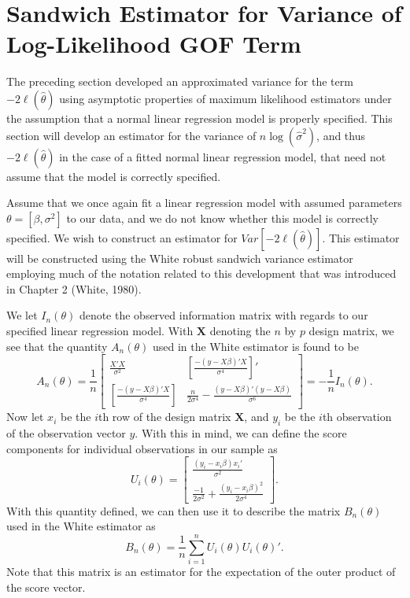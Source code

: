 		\section{Sandwich Estimator for Variance of Log-Likelihood GOF Term} \label{sec:sand_var}

		The preceding section developed an approximated variance for the term $-2 \ell (\hat{\theta})$ using asymptotic properties of maximum likelihood estimators under the assumption
		that a normal linear regression model is properly specified. This section will develop an estimator for the variance of $n\log(\hat{\sigma}^2)$, and thus $-2 \ell (\hat{\theta})$ in
		the case of a fitted normal linear regression model, that need not assume that the model is correctly specified.

		Assume that we once again fit a linear regression model with assumed parameters $\theta = [\beta, \sigma^2]$ to our data, and we do not know whether this model is correctly specified.
		We wish to construct an estimator for $Var \left[ -2 \ell (\hat{\theta}  ) \right]$. This estimator will be constructed using the White robust sandwich variance estimator employing
		much of the notation related to this development that was introduced in Chapter 2 (White, 1980).

		We let $I_{n} (\theta)$ denote the observed information matrix with regards to our specified linear regression model. With $\mathbf{X}$ denoting the $n$ by $p$ design matrix, we see that
		the quantity $A_n (\theta)$ used in the White estimator is found to be 
		\begin{equation}
			A_n(\theta) = \frac{1}{n}
			\begin{bmatrix}
				\frac{X'X}{\sigma^2} & \left[ \frac{-(y-X\beta)'X}{\sigma^4} \right]' \\
				\left[ \frac{-(y-X\beta)'X}{\sigma^4} \right] &  \frac{n}{2 \sigma^4} - \frac{(y-X\beta)'(y-X\beta)}{\sigma^6}
				\end{bmatrix}
				= -\frac{1}{n} I_n(\theta) .
		\end{equation}
		Now let $x_i$ be the $i$th row of the design matrix $\mathbf{X}$, and $y_i$ be the $i$th observation of the observation vector $y$. With this in mind, we can define the score components
		for individual observations in our sample as
		\begin{equation}
			U_i(\theta) = 
			\begin{bmatrix}
				\frac{(y_i-x_i \beta)x_i'}{\sigma^2} \\
				\frac{-1}{2 \sigma^2} + \frac{(y_i - x_i \beta)^2}{2 \sigma^4}
			\end{bmatrix}
			.
		\end{equation}
		With this quantity defined, we can then use it to describe the matrix $B_n (\theta)$ used in the White estimator as
		\begin{equation}
			B_n(\theta) = \frac{1}{n} \sum_{i=1}^{n} U_i(\theta) U_i(\theta)' .
		\end{equation}
		Note that this matrix is an estimator for the expectation of the outer product of the score vector.

